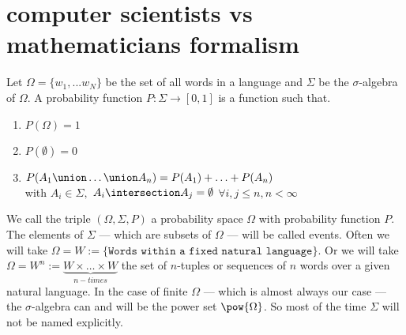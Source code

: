 \section{computer scientists vs mathematicians formalism}
Let $\Omega=\{w_1,...w_N\}$ be the set of all words in a language and $\Sigma$ be the $\sigma$-algebra of $\Omega$.
A probability function $P:\Sigma \to [0,1]$ is a function such that.
\begin{enumerate}
  \item $P(\Omega) = 1$
  \item $P(\emptyset) = 0$
  \item $P(A_1 \union \ldots \union A_n) = P(A_1) + \ldots + P(A_n)$ \\
with $A_i\in\Sigma,$ $A_i \intersection A_j = \emptyset$ $\forall i,j \leq n, n < \infty$
\end{enumerate}
We call the triple $(\Omega, \Sigma, P)$ a probability space $\Omega$ with probability function $P$.
The elements of $\Sigma$ --- which are subsets of $\Omega$ ---  will be called events. 
Often we will take $\Omega = W := \{\texttt{Words within a fixed natural language}\}.$
Or we will take $\Omega = W^n :=\underbrace{W\times\dots\times W}_{n-times}$ the set of $n$-tuples or sequences of $n$ words over a given natural language. 
In the case of finite $\Omega$ --- which is almost always our case --- the $\sigma$-algebra can and will be the power set $\pow{\Omega}$.
So most of the time $\Sigma$ will not be named explicitly.  

